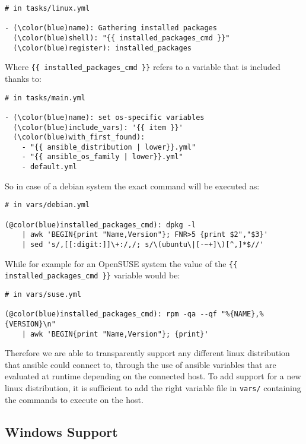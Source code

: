 \documentclass[11pt]{article}
\begin{document}
\begin{Verbatim}[commandchars=\\\(\)]
# in tasks/linux.yml

- (\color(blue)name): Gathering installed packages
  (\color(blue)shell): "{{ installed_packages_cmd }}"
  (\color(blue)register): installed_packages
\end{Verbatim}

Where {\tt \{\{ installed\_packages\_cmd \}\}} refers to a variable that is included thanks to:

\begin{Verbatim}[commandchars=\\\(\)]
# in tasks/main.yml

- (\color(blue)name): set os-specific variables
  (\color(blue)include_vars): '{{ item }}'
  (\color(blue)with_first_found):
    - "{{ ansible_distribution | lower}}.yml"
    - "{{ ansible_os_family | lower}}.yml"
    - default.yml
\end{Verbatim}

So in case of a debian system the exact command will be executed as:

\begin{Verbatim}[commandchars=@\(\)]
# in vars/debian.yml

(@color(blue)installed_packages_cmd): dpkg -l 
    | awk 'BEGIN{print "Name,Version"}; FNR>5 {print $2","$3}' 
    | sed 's/,[[:digit:]]\+:/,/; s/\(ubuntu\|[-~+]\)[^,]*$//'
\end{Verbatim}

While for example for an OpenSUSE system the value of the {\tt \{\{ installed\_packages\_cmd \}\}} variable would be:

\begin{Verbatim}[commandchars=@\(\)]
# in vars/suse.yml

(@color(blue)installed_packages_cmd): rpm -qa --qf "%{NAME},%{VERSION}\n" 
    | awk 'BEGIN{print "Name,Version"}; {print}'
\end{Verbatim}

Therefore we are able to transparently support any different linux distribution that ansible could connect to, through the use of ansible variables that are evaluated at runtime depending on the connected host. To add support for a new linux distribution, it is sufficient to add the right variable file in {\tt vars/} containing the commands to execute on the host.

\subsection{Windows Support}
\end{document}
